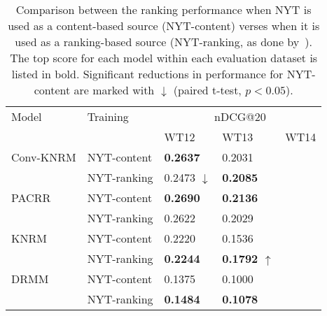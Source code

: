 \begin{table}
\centering
\small
\caption{Comparison between the ranking performance when NYT is used as a content-based source (NYT-content) verses when it is used as a ranking-based source (NYT-ranking, as done by~\cite{Li2018JointLF}). The top score for each model within each evaluation dataset is listed in bold. Significant reductions in performance for NYT-content are marked with $\downarrow$ (paired t-test, $p<0.05$).}
\label{tab:results-nyt-as-content}
\begin{tabular}{lllll}
\toprule
Model &   Training & \multicolumn{3}{c}{nDCG@20}\\ \cmidrule(lr){3-5} 
        &&WT12 & WT13 & WT14 \\
\midrule


Conv-KNRM & NYT-content & \bf0.2637  & 0.2031 \\
 & NYT-ranking & 0.2473 $\downarrow$ & \bf0.2085 \\
\midrule
PACRR & NYT-content & \bf0.2690  & \bf0.2136 \\
 & NYT-ranking & 0.2622  & 0.2029 \\
\midrule
KNRM & NYT-content & 0.2220  & 0.1536 \\
 & NYT-ranking & \bf0.2244  & \bf0.1792 $\uparrow$\\
\midrule
DRMM & NYT-content & 0.1375  & 0.1000 \\
 & NYT-ranking & \bf0.1484  & \bf0.1078 \\


\bottomrule
    \end{tabular}
\end{table}